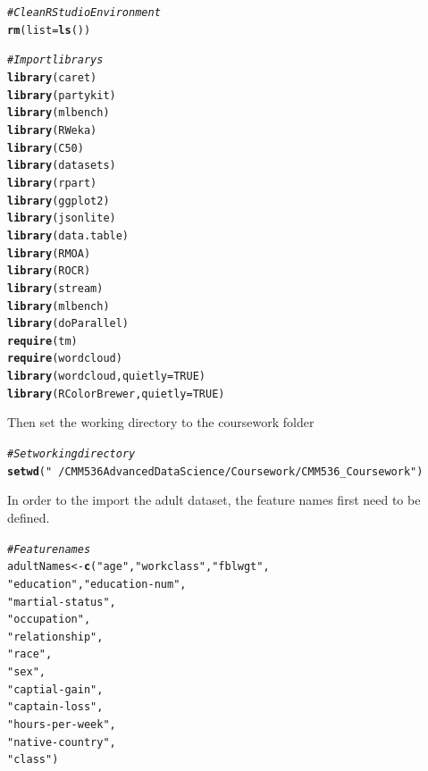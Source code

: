 \documentclass[10pt  ,usenames, dvipsnames]{article}\usepackage[]{graphicx}\usepackage[]{color}
\makeatletter
\newcommand{\hlnum}[1]{\textcolor[rgb]{0.686,0.059,0.569}{#1}}%
\newcommand{\hlstr}[1]{\textcolor[rgb]{0.192,0.494,0.8}{#1}}%
\newcommand{\hlcom}[1]{\textcolor[rgb]{0.678,0.584,0.686}{\textit{#1}}}%
\newcommand{\hlstd}[1]{\textcolor[rgb]{0.345,0.345,0.345}{#1}}%
\newcommand{\hlkwb}[1]{\textcolor[rgb]{0.69,0.353,0.396}{#1}}%
\newcommand{\hlkwc}[1]{\textcolor[rgb]{0.333,0.667,0.333}{#1}}%
\newcommand{\hlkwd}[1]{\textcolor[rgb]{0.737,0.353,0.396}{\textbf{#1}}}%
\newenvironment{kframe}{%
 \def\at@end@of@kframe{}%
 \ifinner\ifhmode%
  \def\at@end@of@kframe{\end{minipage}}%
  \begin{minipage}{\columnwidth}%
 \fi\fi%
 \def\FrameCommand##1{\hskip\@totalleftmargin \hskip-\fboxsep
 \colorbox{shadecolor}{##1}\hskip-\fboxsep
     \hskip-\linewidth \hskip-\@totalleftmargin \hskip\columnwidth}%
 \MakeFramed {\advance\hsize-\width
   \@totalleftmargin\z@ \linewidth\hsize
   \@setminipage}}%
 {\par\unskip\endMakeFramed%
 \at@end@of@kframe}
\newenvironment{knitrout}{}{} %
\makeatother
\begin{document}
\begin{knitrout}
\color{fgcolor}\begin{kframe}
\begin{alltt}
\hlcom{#Clean RStudio Environment}
\hlkwd{rm}\hlstd{(}\hlkwc{list} \hlstd{=} \hlkwd{ls}\hlstd{())}

\hlcom{#Import librarys}
\hlkwd{library}\hlstd{(caret)}
\hlkwd{library}\hlstd{(partykit)}
\hlkwd{library}\hlstd{(mlbench)}
\hlkwd{library}\hlstd{(RWeka)}
\hlkwd{library}\hlstd{(C50)}
\hlkwd{library}\hlstd{(datasets)}
\hlkwd{library}\hlstd{(rpart)}
\hlkwd{library}\hlstd{(ggplot2)}
\hlkwd{library}\hlstd{(jsonlite)}
\hlkwd{library}\hlstd{(data.table)}
\hlkwd{library}\hlstd{(RMOA)}
\hlkwd{library}\hlstd{(ROCR)}
\hlkwd{library}\hlstd{(stream)}
\hlkwd{library}\hlstd{(mlbench)}
\hlkwd{library}\hlstd{(doParallel)}
\hlkwd{require}\hlstd{(tm)}
\hlkwd{require}\hlstd{(wordcloud)}
\hlkwd{library}\hlstd{(wordcloud,}\hlkwc{quietly}\hlstd{=}\hlnum{TRUE}\hlstd{)}
\hlkwd{library}\hlstd{(RColorBrewer,}\hlkwc{quietly}\hlstd{=}\hlnum{TRUE}\hlstd{)}
\end{alltt}
\end{kframe}
\end{knitrout}



Then set the working directory to the coursework folder

\begin{knitrout}
\color{fgcolor}\begin{kframe}
\begin{alltt}
\hlcom{#Set working directory}
\hlkwd{setwd}\hlstd{(}\hlstr{"~/CMM536 Advanced Data Science/Coursework/CMM536_Coursework"}\hlstd{)}
\end{alltt}
\end{kframe}
\end{knitrout}



\clearpage

In order to the import the adult dataset, the feature names first need to be defined.
\begin{knitrout}
\color{fgcolor}\begin{kframe}
\begin{alltt}
\hlcom{#Feature names}
\hlstd{adultNames} \hlkwb{<-} \hlkwd{c}\hlstd{(}\hlstr{"age"}\hlstd{,} \hlstr{"workclass"}\hlstd{,} \hlstr{"fblwgt"}\hlstd{,}
                \hlstr{"education"}\hlstd{,} \hlstr{"education-num"}\hlstd{,}
                \hlstr{"martial-status"}\hlstd{,}
                \hlstr{"occupation"}\hlstd{,}
                \hlstr{"relationship"}\hlstd{,}
                \hlstr{"race"}\hlstd{,}
                \hlstr{"sex"}\hlstd{,}
                \hlstr{"captial-gain"}\hlstd{,}
                \hlstr{"captain-loss"}\hlstd{,}
                \hlstr{"hours-per-week"}\hlstd{,}
                \hlstr{"native-country"}\hlstd{,}
                \hlstr{"class"}\hlstd{)}
\end{alltt}
\end{kframe}
\end{knitrout}
\end{document}
